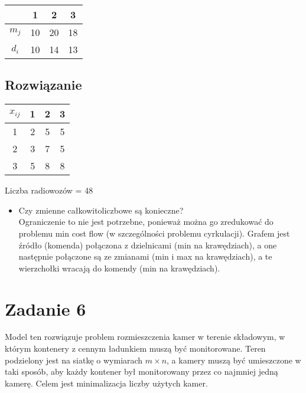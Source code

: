 \documentclass[12pt, letterpaper]{article}
\begin{document}
\begin{center}
  \begin{tabular}{|c|c|c|c|}
    \hline
              & 1  & 2  & 3  \\
    \hline
    \( m_j \) & 10 & 20 & 18 \\
    \( d_i \) & 10 & 14 & 13 \\
    \hline
  \end{tabular}
\end{center}

\subsection{Rozwiązanie}

\begin{center}
  \begin{tabular}{|c|c|c|c|}
    \hline
    \( x_{ij} \) & 1 & 2 & 3 \\
    \hline
    1            & 2 & 5 & 5 \\
    2            & 3 & 7 & 5 \\
    3            & 5 & 8 & 8 \\
    \hline
  \end{tabular}
\end{center}

Liczba radiowozów = 48

\begin{itemize}
  \item Czy zmienne całkowitoliczbowe są konieczne? \\
        Ograniczenie to nie jest potrzebne, ponieważ można go zredukować
        do problemu min cost flow (w szczególności problemu cyrkulacji).
        Grafem jest źródło (komenda) połączona z dzielnicami (min na
        krawędziach), a one następnie
        połączone są ze zmianami (min i max na krawędziach), a te wierzchołki
        wracają do komendy (min na krawędziach).
\end{itemize}

\section{Zadanie 6}

Model ten rozwiązuje problem rozmieszczenia kamer w terenie składowym, w którym
kontenery z cennym ładunkiem muszą być monitorowane. Teren podzielony jest na
siatkę o wymiarach \( m \times n \), a kamery muszą być umieszczone w taki
sposób, aby każdy kontener był monitorowany przez co najmniej jedną kamerę.
Celem jest minimalizacja liczby użytych kamer.
\end{document}
